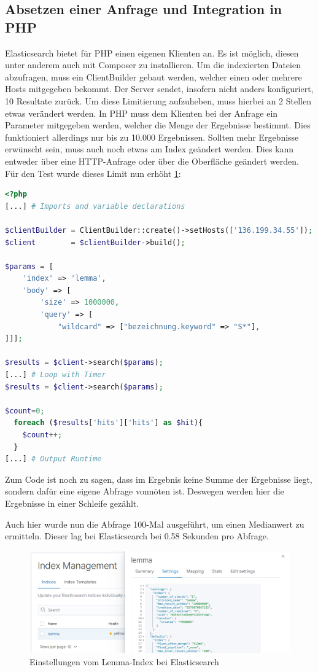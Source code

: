 \subsection{Absetzen einer Anfrage und Integration in PHP}

Elasticsearch bietet für PHP einen eigenen Klienten an. Es ist möglich, diesen unter anderem auch mit Composer zu installieren. Um die indexierten Dateien abzufragen, muss ein ClientBuilder gebaut werden, welcher einen oder mehrere Hosts mitgegeben bekommt. Der Server sendet, insofern nicht anders konfiguriert, 10 Resultate zurück. Um diese Limitierung aufzuheben, muss hierbei an 2 Stellen etwas verändert werden. In PHP muss dem Klienten bei der Anfrage ein Parameter mitgegeben werden, welcher die Menge der Ergebnisse bestimmt. Dies funktioniert allerdings nur bis zu 10.000 Ergebnissen. Sollten mehr Ergebnisse erwünscht sein, muss auch noch etwas am Index geändert werden. Dies kann entweder über eine HTTP-Anfrage oder über die Oberfläche geändert werden. Für den Test wurde dieses Limit nun erhöht \ref{img:elasticIndexSettings}:


\begin{lstlisting}[language=php, frame=single, label={lst:phpElastic}, morekeywords={type,uninvertible,indexed,stored,field,multiValued, name}, caption=Abfrage in PHP an Elasticsearch,captionpos=b] 
<?php
[...] # Imports and variable declarations

$clientBuilder = ClientBuilder::create()->setHosts(['136.199.34.55']);
$client        = $clientBuilder->build();

$params = [
    'index' => 'lemma',
    'body' => [
        'size' => 1000000,
        'query' => [
            "wildcard" => ["bezeichnung.keyword" => "S*"],
]]];

$results = $client->search($params);
[...] # Loop with Timer  
$results = $client->search($params);

$count=0;
  foreach ($results['hits']['hits'] as $hit){
    $count++;
  }
[...] # Output Runtime
\end{lstlisting}

Zum Code ist noch zu sagen, dass im Ergebnis keine Summe der Ergebnisse liegt, sondern dafür eine eigene Abfrage vonnöten ist. Deswegen werden hier die Ergebnisse in einer Schleife gezählt.

Auch hier wurde nun die Abfrage 100-Mal ausgeführt, um einen Medianwert zu ermitteln. Dieser lag bei Elasticsearch bei 0.58 Sekunden pro Abfrage.

\begin{figure}
	\centering
	\includegraphics[width=1\linewidth]{images/elastic_index_settings.png}
	\caption{Einstellungen vom Lemma-Index bei Elasticsearch}
	\label{img:elasticIndexSettings}
\end{figure}


